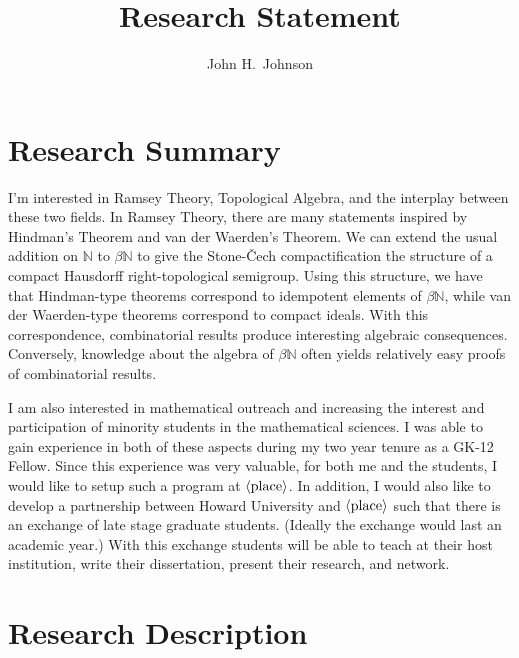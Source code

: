 \documentclass[12pt]{article}
\title{Research Statement}
\author{John H.~Johnson}
\theoremstyle{plain}
\theoremstyle{definition}
\newcommand{\bbN}{\mathbb{N}}
\newcommand{\la}{\langle}
\newcommand{\ra}{\rangle}
\begin{document}
\maketitle
\tableofcontents
\section{Research Summary}
I'm interested in Ramsey Theory, Topological Algebra, and the
interplay between these two fields.
In Ramsey Theory, there are many statements inspired by Hindman's
Theorem and van der Waerden's Theorem.
We can extend the usual addition on $\bbN$ to $\beta\bbN$ to give the
Stone-\v{C}ech compactification the structure of a compact Hausdorff
right-topological semigroup.
Using this structure, we have that Hindman-type theorems correspond to
idempotent elements of $\beta\bbN$, while van der Waerden-type
theorems correspond to compact ideals.
With this correspondence, combinatorial results produce interesting
algebraic consequences.
Conversely, knowledge about the algebra of $\beta\bbN$ often yields
relatively easy proofs of combinatorial results. 

I am also interested in mathematical outreach and increasing the
interest and participation of minority students in the mathematical
sciences. 
I was able to gain experience in both of these aspects during my two
year tenure as a GK-12 Fellow.
Since this experience was very valuable, for both me and the students,
I would like to setup such a program at $\la\hbox{place}\ra$.
In addition, I would also like to develop a partnership between Howard
University and $\la\hbox{place}\ra$ such that there is an exchange of
late stage graduate students. 
(Ideally the exchange would last an academic year.)
With this exchange students will be able to teach at their host
institution, write their dissertation, present their research, and
network. 

\section{Research Description}
\end{document}
